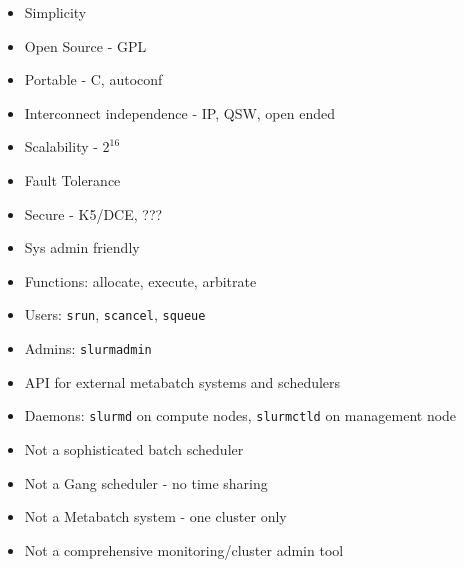 \documentclass[letter,landscape]{seminar}
\begin{document}


\begin{slide}
\begin{center}
\end{center}
\end{slide}


\begin{slide}
  \begin{itemize}
    \item{Simplicity}
    \item{Open Source - GPL}
    \item{Portable - C, autoconf}
    \item{Interconnect independence - IP, QSW, open ended}
    \item{Scalability - $2^{16}$}
    \item{Fault Tolerance}
    \item{Secure - K5/DCE, ???}
    \item{Sys admin friendly}
  \end{itemize}
\end{slide}

\begin{slide}
  \begin{itemize}
    \item{Functions: allocate, execute, arbitrate}
    \item{Users: {\tt srun}, {\tt scancel}, {\tt squeue}}
    \item{Admins: {\tt slurmadmin}}
    \item{API for external metabatch systems and schedulers}
    \item{Daemons: {\tt slurmd} on compute nodes, {\tt slurmctld} on management node}
  \end{itemize}
\end{slide}

\begin{slide}
  \begin{itemize}
    \item{Not a sophisticated batch scheduler}
    \item{Not a Gang scheduler - no time sharing}
    \item{Not a Metabatch system - one cluster only}
    \item{Not a comprehensive monitoring/cluster admin tool}
  \end{itemize}
\end{slide}
\end{document}
